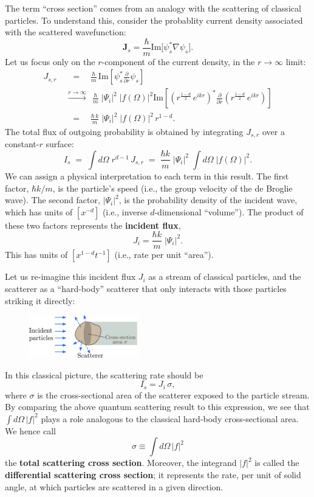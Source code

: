 \documentclass[pra,12pt]{revtex4}
\begin{document}
The term ``cross section'' comes from an analogy with the scattering
of classical particles.  To understand this, consider the probablity
current density associated with the scattered wavefunction:
$$\mathbf{J}_s = \frac{\hbar}{m} \mathrm{Im}\big[\psi_s^*\nabla\psi_s\big].$$
Let us focus only on the $r$-component of the current density, in the
$r\rightarrow\infty$ limit:
$$\begin{aligned}J_{s,r}\; &\;\;=\;\;\;\, \frac{\hbar}{m}\, \mathrm{Im}\left[\psi_s^* \frac{\partial}{\partial r}\psi_s\right] \\ &\overset{r\rightarrow\infty}{\longrightarrow}\;\, \frac{\hbar}{m}\; |\Psi_i|^2 \; |f(\Omega)|^2 \mathrm{Im}\left[\left(r^{\frac{1-d}{2}} \, e^{ikr}\right)^* \frac{\partial}{\partial r} \left(r^{\frac{1-d}{2}} \, e^{ikr}\right)\right] \\ & \;\;=\;\;\;\, \frac{\hbar \,k}{m}\; |\Psi_i|^2 \; |f(\Omega)|^2 \,r^{1-d}.\end{aligned}$$
The total flux of outgoing probability is obtained by integrating
$J_{s,r}$ over a constant-$r$ surface:
$$I_s \;=\; \int d\Omega\; r^{d-1} \, J_{s,r} \;=\; \frac{\hbar k}{m} \;|\Psi_i|^2 \; \int d\Omega\; \big|f(\Omega)\big|^2.$$
We can assign a physical interpretation to each term in this
result.  The first factor, $\hbar k/m$, is the
particle's speed (i.e., the group velocity of the de Broglie wave).
The second factor, $|\Psi_i|^2$, is the probability density of the incident
wave, which has units of $[x^{-d}]$ (i.e., inverse $d$-dimensional
``volume'').  The product of these two factors represents the
\textbf{incident flux},
$$J_{i} = \frac{\hbar k}{m} \;|\Psi_i|^2.$$
This has units of $[x^{1-d}t^{-1}]$ (i.e., rate per unit ``area'').

Let us re-imagine this incident flux $J_i$ as a stream of classical
particles, and the scatterer as a ``hard-body'' scatterer that only
interacts with those particles striking it directly:

\begin{figure}[h]
  \centering\includegraphics[width=0.42\textwidth]{crosssection}
\end{figure}

In this classical picture, the scattering rate should be
$$I_s = J_i \, \sigma,$$
where $\sigma$ is the cross-sectional area of the scatterer exposed to
the particle stream.  By comparing the above quantum scattering result
to this expression, we see that $\int d\Omega\,|f|^2$ plays a role
analogous to the classical hard-body cross-sectional area.  We hence
call
$$\sigma \equiv \int d\Omega\,|f|^2$$
the \textbf{total scattering cross section}.  Moreover, the integrand
$|f|^2$ is called the \textbf{differential scattering cross section};
it represents the rate, per unit of solid angle, at which particles
are scattered in a given direction.
\end{document}
